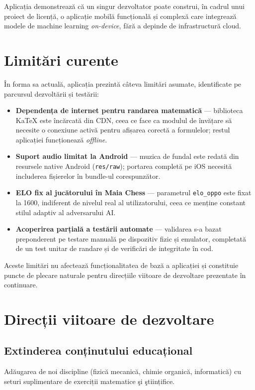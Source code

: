 \documentclass[12pt, a4paper, twoside]{report}
\numberwithin{equation}{section}
\begin{document}
Aplicația demonstrează că un singur dezvoltator poate construi, în cadrul unui proiect
de licență, o aplicație mobilă funcțională și complexă care integrează modele de
machine learning \textit{on-device}, fără a depinde de infrastructură cloud.

\section{Limitări curente}

În forma sa actuală, aplicația prezintă câteva limitări asumate, identificate pe parcursul
dezvoltării și testării:
\begin{itemize}
  \item \textbf{Dependența de internet pentru randarea matematică} — biblioteca KaTeX este
    încărcată din CDN, ceea ce face ca modulul de învățare să necesite o conexiune activă
    pentru afișarea corectă a formulelor; restul aplicației funcționează \textit{offline}.
  \item \textbf{Suport audio limitat la Android} — muzica de fundal este redată din resursele
    native Android (\texttt{res/raw}); portarea completă pe iOS necesită includerea
    fișierelor în bundle-ul corespunzător.
  \item \textbf{ELO fix al jucătorului în Maia Chess} — parametrul \texttt{elo\_oppo} este
    fixat la 1600, indiferent de nivelul real al utilizatorului, ceea ce menține constant
    stilul adaptiv al adversarului AI.
  \item \textbf{Acoperirea parțială a testării automate} — validarea s-a bazat preponderent
    pe testare manuală pe dispozitiv fizic și emulator, completată de un test unitar de
    randare și de verificări de integritate în cod.
\end{itemize}
Aceste limitări nu afectează funcționalitatea de bază a aplicației și constituie puncte de
plecare naturale pentru direcțiile viitoare de dezvoltare prezentate în continuare.

\section{Direcții viitoare de dezvoltare}

\subsection{Extinderea conținutului educațional}
Adăugarea de noi discipline (fizică mecanică, chimie organică, informatică) cu seturi
suplimentare de exerciții matematice şi ştiințifice.
\end{document}
